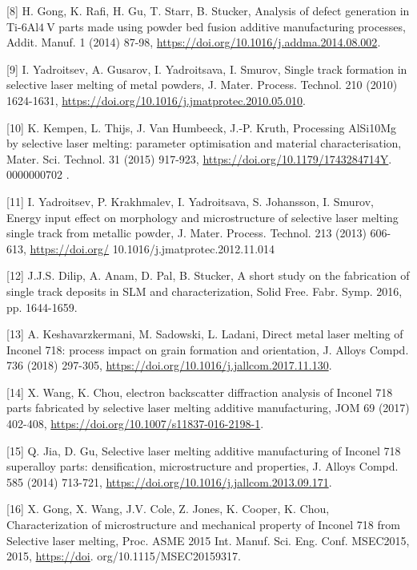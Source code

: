 \documentclass[10pt]{article}
\begin{document}
[8] H. Gong, K. Rafi, H. Gu, T. Starr, B. Stucker, Analysis of defect generation in Ti-6Al$4 \mathrm{~V}$ parts made using powder bed fusion additive manufacturing processes, Addit. Manuf. 1 (2014) 87-98, \href{https://doi.org/10.1016/j.addma.2014.08.002}{https://doi.org/10.1016/j.addma.2014.08.002}.

[9] I. Yadroitsev, A. Gusarov, I. Yadroitsava, I. Smurov, Single track formation in selective laser melting of metal powders, J. Mater. Process. Technol. 210 (2010) 1624-1631, \href{https://doi.org/10.1016/j.jmatprotec.2010.05.010}{https://doi.org/10.1016/j.jmatprotec.2010.05.010}.

[10] K. Kempen, L. Thijs, J. Van Humbeeck, J.-P. Kruth, Processing AlSi10Mg by selective laser melting: parameter optimisation and material characterisation, Mater. Sci. Technol. 31 (2015) 917-923, \href{https://doi.org/10.1179/1743284714Y}{https://doi.org/10.1179/1743284714Y}. 0000000702 .

[11] I. Yadroitsev, P. Krakhmalev, I. Yadroitsava, S. Johansson, I. Smurov, Energy input effect on morphology and microstructure of selective laser melting single track from metallic powder, J. Mater. Process. Technol. 213 (2013) 606-613, \href{https://doi.org/}{https://doi.org/} 10.1016/j.jmatprotec.2012.11.014

[12] J.J.S. Dilip, A. Anam, D. Pal, B. Stucker, A short study on the fabrication of single track deposits in SLM and characterization, Solid Free. Fabr. Symp. 2016, pp. 1644-1659.

[13] A. Keshavarzkermani, M. Sadowski, L. Ladani, Direct metal laser melting of Inconel 718: process impact on grain formation and orientation, J. Alloys Compd. 736 (2018) 297-305, \href{https://doi.org/10.1016/j.jallcom.2017.11.130}{https://doi.org/10.1016/j.jallcom.2017.11.130}.

[14] X. Wang, K. Chou, electron backscatter diffraction analysis of Inconel 718 parts fabricated by selective laser melting additive manufacturing, JOM 69 (2017) 402-408, \href{https://doi.org/10.1007/s11837-016-2198-1}{https://doi.org/10.1007/s11837-016-2198-1}.

[15] Q. Jia, D. Gu, Selective laser melting additive manufacturing of Inconel 718 superalloy parts: densification, microstructure and properties, J. Alloys Compd. 585 (2014) 713-721, \href{https://doi.org/10.1016/j.jallcom.2013.09.171}{https://doi.org/10.1016/j.jallcom.2013.09.171}.

[16] X. Gong, X. Wang, J.V. Cole, Z. Jones, K. Cooper, K. Chou, Characterization of microstructure and mechanical property of Inconel 718 from Selective laser melting, Proc. ASME 2015 Int. Manuf. Sci. Eng. Conf. MSEC2015, 2015, \href{https://doi}{https://doi}. org/10.1115/MSEC20159317.
\end{document}
